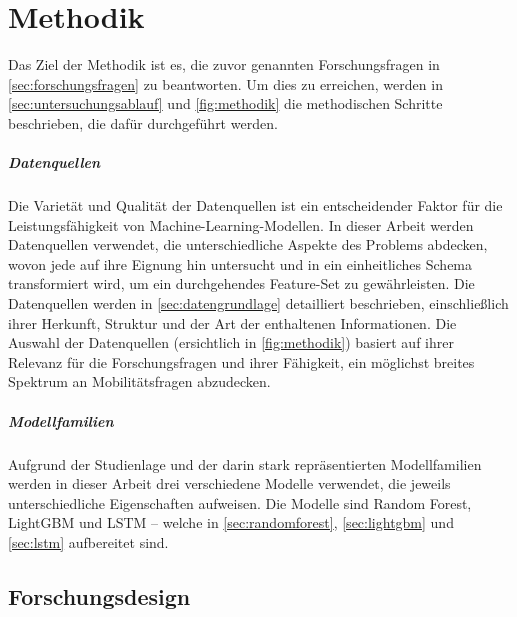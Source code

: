 \chapter{Methodik}
\label{ch:methodik}

Das Ziel der Methodik ist es, die zuvor genannten Forschungsfragen in \cref{sec:forschungsfragen} zu beantworten. Um dies zu erreichen, werden in \cref{sec:untersuchungsablauf} und \cref{fig:methodik} die methodischen Schritte beschrieben, die dafür durchgeführt werden. 


\paragraph{Datenquellen}

Die Varietät und Qualität der Datenquellen ist ein entscheidender Faktor für die Leistungsfähigkeit von Machine-Learning-Modellen. In dieser Arbeit werden Datenquellen verwendet, die unterschiedliche Aspekte des Problems abdecken, wovon jede auf ihre Eignung hin untersucht und in ein einheitliches Schema transformiert wird, um ein durchgehendes Feature-Set zu gewährleisten. Die Datenquellen werden in \cref{sec:datengrundlage} detailliert beschrieben, einschließlich ihrer Herkunft, Struktur und der Art der enthaltenen Informationen. Die Auswahl der Datenquellen (ersichtlich in \cref{fig:methodik}) basiert auf ihrer Relevanz für die Forschungsfragen und ihrer Fähigkeit, ein möglichst breites Spektrum an Mobilitätsfragen abzudecken. 



\paragraph{Modellfamilien}

Aufgrund der Studienlage und der darin stark repräsentierten Modellfamilien werden in dieser Arbeit drei verschiedene Modelle verwendet, die jeweils unterschiedliche Eigenschaften aufweisen. Die Modelle sind Random Forest, LightGBM und LSTM -- welche in \cref{sec:randomforest}, \cref{sec:lightgbm} und \cref{sec:lstm} aufbereitet sind.


\section{Forschungsdesign}
\label{sec:forschungsdesign}

